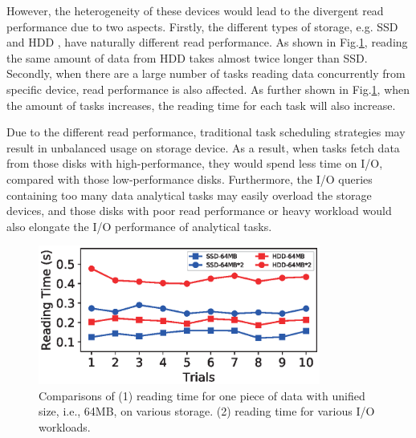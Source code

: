 \documentclass[conference]{IEEEtran}
\begin{document}
However, the heterogeneity of these devices would lead to the divergent read performance due to two aspects. Firstly, the different types of storage, e.g. SSD \cite{b32} and HDD \cite{b33}, have naturally different read performance. As shown in Fig.\ref{Fig:motivation}, reading the same amount of data from HDD takes almost twice longer than SSD. Secondly, when there are a large number of tasks reading data concurrently from specific device, read performance is also affected. As further shown in Fig.\ref{Fig:motivation}, when the amount of tasks increases, the reading time for each task will also increase.

Due to the different read performance, traditional task scheduling strategies may result in unbalanced usage on storage device. As a result, when tasks fetch data from those disks with high-performance, they would spend less time on I/O, compared with those low-performance disks. Furthermore, the I/O queries containing too many data analytical tasks may easily overload the storage devices, and those disks with poor read performance or heavy workload would also elongate the I/O performance of analytical tasks.

\begin{figure}[!t]
	\centering
	\includegraphics[height=1.8in]{fig_motivation5.eps}
	\caption{Comparisons of (1) reading time for one piece of data with unified size, i.e., 64MB, on various storage. (2) reading time for various I/O workloads.}
	\label{Fig:motivation}
\end{figure} 

 
\end{document}
